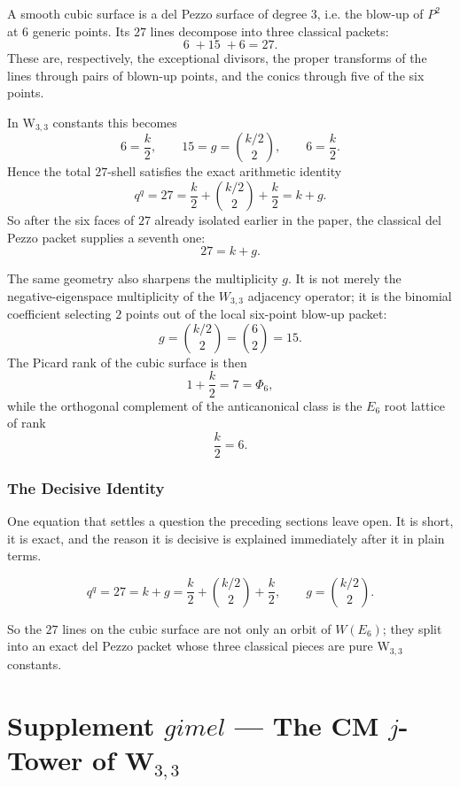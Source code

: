 \documentclass[12pt,a4paper]{article}
\def\mathbf#1{#1}%
\def\Phi#1{Phi#1}%
\def\gimel{gimel}%
\theoremstyle{definition}
\begin{document}
A smooth cubic surface is a del Pezzo surface of degree $3$, i.e. the blow-up
of $\mathbf P^2$ at $6$ generic points.  Its $27$ lines decompose into three
classical packets:
\[
6 \;+ 15 \;+
6
= 27.
\]
These are, respectively, the exceptional divisors, the proper transforms of the
lines through pairs of blown-up points, and the conics through five of the six
points.

In W$_{3,3}$ constants this becomes
\[
6 = \frac{k}{2},
\qquad
15 = g = \binom{k/2}{2},
\qquad
6 = \frac{k}{2}.
\]
Hence the total $27$-shell satisfies the exact arithmetic identity
\[
q^q = 27 = \frac{k}{2} + \binom{k/2}{2} + \frac{k}{2} = k + g.
\]
So after the six faces of $27$ already isolated earlier in the paper, the
classical del Pezzo packet supplies a seventh one:
\[
27 = k + g.
\]

The same geometry also sharpens the multiplicity $g$.  It is not merely the
negative-eigenspace multiplicity of the $W_{3,3}$ adjacency operator; it is the
binomial coefficient selecting $2$ points out of the local six-point blow-up
packet:
\[
g = \binom{k/2}{2} = \binom{6}{2} = 15.
\]
The Picard rank of the cubic surface is then
\[
1 + \frac{k}{2} = 7 = \Phi_6,
\]
while the orthogonal complement of the anticanonical class is the $E_6$ root
lattice of rank
\[
\frac{k}{2} = 6.
\]

\section*{The Decisive Identity}

\begin{plainbox}
One equation that settles a question the preceding sections leave open. It is short,
it is exact, and the reason it is decisive is explained immediately after it in plain
terms.
\end{plainbox}


\[
\boxed{\;
q^q = 27 = k + g = \frac{k}{2} + \binom{k/2}{2} + \frac{k}{2},
\qquad
g = \binom{k/2}{2}.
\;}
\]

So the $27$ lines on the cubic surface are not only an orbit of $W(E_6)$; they
split into an exact del Pezzo packet whose three classical pieces are pure
W$_{3,3}$ constants.

\clearpage
\part*{\texorpdfstring{Supplement $\gimel$ --- The CM $j$-Tower of W$_{3,3}$}{Supplement gimel --- The CM j-Tower of W(3,3)}}
\end{document}
